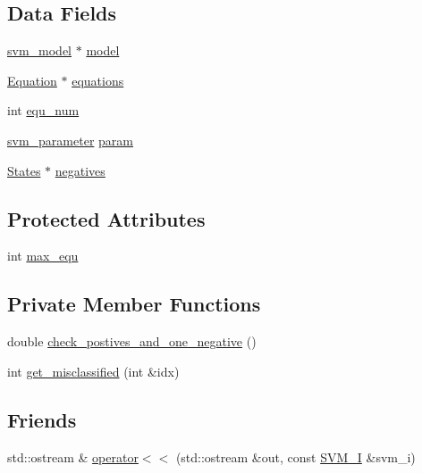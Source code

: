 \subsection*{Data Fields}
\begin{DoxyCompactItemize}
\item 
\hyperlink{structsvm__model}{svm\+\_\+model} $\ast$ \hyperlink{classSVM__I_a7b7466c2246c73438ead77631278ff3a}{model}
\item 
\hyperlink{classEquation}{Equation} $\ast$ \hyperlink{classSVM__I_af905b6378094007502fa5d81f018a11b}{equations}
\item 
int \hyperlink{classSVM__I_ab674468eec42010761332da3f9b2f69c}{equ\+\_\+num}
\item 
\hyperlink{structsvm__parameter}{svm\+\_\+parameter} \hyperlink{classSVM__I_afbec56807dada05e9e527587d25acfb6}{param}
\item 
\hyperlink{classStates}{States} $\ast$ \hyperlink{classSVM__I_a8a56898f346ff15c5bb904ff6e001dad}{negatives}
\end{DoxyCompactItemize}
\subsection*{Protected Attributes}
\begin{DoxyCompactItemize}
\item 
int \hyperlink{classSVM__I_aaa890d6eaac46a447820a368f056eea7}{max\+\_\+equ}
\end{DoxyCompactItemize}
\subsection*{Private Member Functions}
\begin{DoxyCompactItemize}
\item 
double \hyperlink{classSVM__I_aa8eb2219340d322c9293e0d24a8b0e2e}{check\+\_\+postives\+\_\+and\+\_\+one\+\_\+negative} ()
\item 
int \hyperlink{classSVM__I_a099369c15005eea9f7d69c820431e0cb}{get\+\_\+misclassified} (int \&idx)
\end{DoxyCompactItemize}
\subsection*{Friends}
\begin{DoxyCompactItemize}
\item 
std\+::ostream \& \hyperlink{classSVM__I_ac0ce6164082022082361d78ba7b1c245}{operator$<$$<$} (std\+::ostream \&out, const \hyperlink{classSVM__I}{S\+V\+M\+\_\+I} \&svm\+\_\+i)
\end{DoxyCompactItemize}


